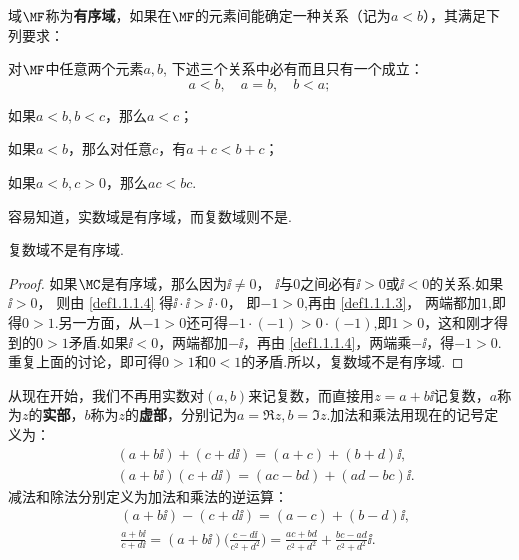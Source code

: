 \begin{definition}\label{def1.1.1}
域$\MF$称为\textbf{有序域}，如果在$\MF$的元素间能确定一种关系（记为$a<b$），其满足下列要求：
\begin{eenum}
  \item \label{def1.1.1.1}对$\MF$中任意两个元素$a,b$, 下述三个关系中必有而且只有一个成立：
  \[a<b,\quad a=b,\quad b<a;\]
  \item \label{def1.1.1.2}如果$a<b,b<c$，那么$a<c$；
  \item \label{def1.1.1.3}如果$a<b$，那么对任意$c$，有$a+c<b+c$；
  \item \label{def1.1.1.4}如果$a<b,c>0$，那么$ac<bc$.
\end{eenum}
\end{definition}
容易知道，实数域是有序域，而复数域则不是.
\begin{theorem}\label{thm1.1.2}
复数域不是有序域.
\end{theorem}
\begin{proof}
如果$\MC$是有序域，那么因为$\ii\ne0$， $\ii$与$0$之间必有$\ii>0$或$\ii<0$的关系.如果$\ii>0$， 则由 \ref{def1.1.1.4} 得$\ii\cdot\ii>\ii\cdot0$， 即$-1>0$,再由 \ref{def1.1.1.3}， 两端都加$1$,即得$0>1$.另一方面，从$-1>0$还可得$-1\cdot(-1)>0\cdot(-1)$,即$1>0$，这和刚才得到的$0>1$矛盾.如果$\ii<0$，两端都加$-\ii$，再由 \ref{def1.1.1.4}，两端乘$-\ii$，得$-1>0$.重复上面的讨论，即可得$0>1$和$0<1$的矛盾.所以，复数域不是有序域.
\end{proof}

从现在开始，我们不再用实数对$(a,b)$来记复数，而直接用$z=a+b\ii$记复数，$a$称为$z$的\textbf{实部}，$b$称为$z$的\textbf{虚部}，分别记为$a=\Re z,b=\Im z$.加法和乘法用现在的记号定义为：
\begin{align*}
&(a+b\ii)+(c+d\ii)=(a+c)+(b+d)\ii,\\
&(a+b\ii)(c+d\ii)=(ac-bd)+(ad-bc)\ii.
\end{align*}
减法和除法分别定义为加法和乘法的逆运算：
\begin{align*}
&(a+b\ii)-(c+d\ii)=(a-c)+(b-d)\ii,\\
&\frac{a+b\ii}{c+d\ii}=(a+b\ii)\bigg(\frac{c-d\ii}{c^2+d^2}\bigg)
=\frac{ac+bd}{c^2+d^2}+\frac{bc-ad}{c^2+d^2}\ii.
\end{align*}

